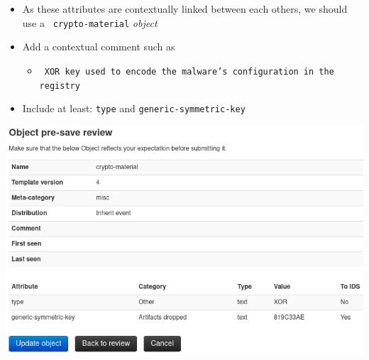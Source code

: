 \begin{frame}
    \begin{itemize}
        \item As these attributes are contextually linked between each others, we should use a \texttt{\color{black} crypto-material} \textit{object}
        \item Add a contextual comment such as
        \begin{itemize}
            \item \texttt{\color{black} XOR key used to encode the malware's configuration in the registry}
        \end{itemize}
        \item Include at least: \texttt{type} and \texttt{generic-symmetric-key}
    \end{itemize}
    \begin{center}
        \includegraphics[width=0.6\linewidth]{pictures/case2/object-crypto.png}
    \end{center}
\end{frame}

